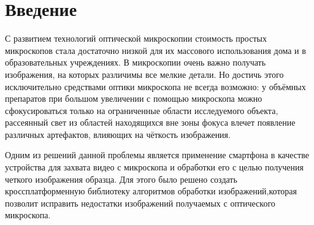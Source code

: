 \documentclass[14pt]{matmex-diploma-custom}
\begin{document}

\maketitle
\tableofcontents
\section*{Введение}

С развитием технологий оптической микроскопии стоимость простых микроскопов стала достаточно низкой для их массового использования дома и в образовательных учреждениях. В микроскопии очень важно получать изображения, на которых различимы все мелкие детали. Но достичь этого исключительно средствами оптики микроскопа не всегда возможно: у объёмных препаратов при большом увеличении с помощью микроскопа можно сфокусироваться только на ограниченные области исследуемого объекта, рассеянный свет из областей находящихся вне зоны фокуса влечет появление различных артефактов, влияющих на чёткость изображения. 
\par
Одним из решений данной проблемы является применение смартфона в качестве устройства для захвата видео с микроскопа и обработки его с целью получения четкого изображения образца. Для этого было решено создать кроссплатформенную библиотеку алгоритмов обработки изображений,которая позволит исправить недостатки изображений получаемых с оптического микроскопа. 
\end{document}
